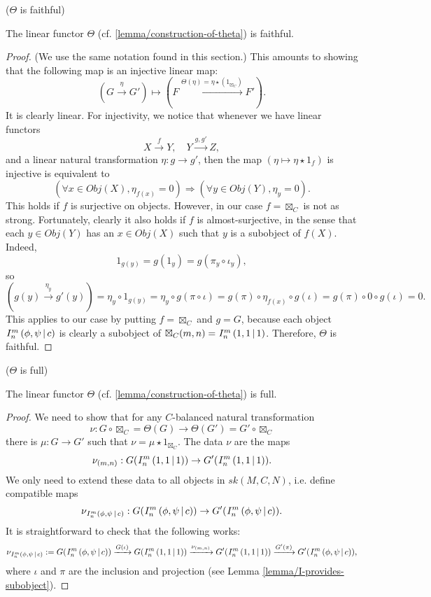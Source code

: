 \begin{lemma}\label{lemma/theta-is-faithful} ($\Theta$ is faithful)

  \noindent The linear functor $\Theta$ (cf. \ref{lemma/construction-of-theta}) is faithful.
\end{lemma}

\begin{proof}
  (We use the same notation found in this section.) This amounts to showing
  that the following map is an injective linear map:
  \[
    (G \xrightarrow{\eta} G') \mapsto (F \xrightarrow{\Theta(\eta) = \eta \star (1_{\boxtimes_{C}})} F').
  \]
  It is clearly linear. For injectivity, we notice that whenever we have
  linear functors
  \[
    X \xrightarrow{f} Y,\quad Y \xrightarrow{g, g'} Z,
  \]
  and a linear natural transformation $\eta: g \to g'$, then the map $(\eta \mapsto \eta \star 1_{f})$ is injective is equivalent to
  \[
    (\forall x \in Obj(X), \eta_{f(x)} = 0) \Rightarrow (\forall y \in Obj(Y), \eta_{y} = 0).
  \]
  This holds if $f$ is surjective on objects. However, in our case
  $f = \boxtimes_{C}$ is not as strong. Fortunately, clearly it also holds if
  $f$ is almost-surjective, in the sense that each $y \in Obj(Y)$ has an
  $x \in Obj(X)$ such that $y$ is a subobject of $f(X)$. Indeed,
  \[
    1_{g(y)} = g(1_{y}) = g(\pi_{y} \circ \iota_{y}),
  \]
  so
  \[
    (g(y) \xrightarrow{\eta_{y}} g'(y)) = \eta_{y} \circ 1_{g(y)} = \eta_{y} \circ g(\pi \circ \iota) = g(\pi) \circ \eta_{f(x)} \circ g(\iota) = g(\pi) \circ 0 \circ g(\iota) = 0.
  \]
  This applies to our case by putting $f = \boxtimes_{C}$ and $g = G$, because
  each object ${}^{}_{} I^{m}_{n} \left( \phi, \psi \,\middle|\, c \right)$ is clearly a subobject of
  $\boxtimes_{C}(m,n) = {}^{}_{} I^{m}_{n} \left( 1, 1 \,\middle|\, 1 \right)$. Therefore, $\Theta$ is faithful.
\end{proof}

\begin{lemma}\label{lemma/theta-is-full} ($\Theta$ is full)

  \noindent The linear functor $\Theta$ (cf. \ref{lemma/construction-of-theta}) is full.
\end{lemma}

\begin{proof}
  We need to show that for any $C$-balanced natural transformation
  \[
    \nu: G \circ \boxtimes_{C} = \Theta(G) \to \Theta(G') = G' \circ \boxtimes_{C}
  \]
  there is $\mu: G \to G'$ such that $\nu = \mu \star 1_{\boxtimes_{C}}$. The data $\nu$ are the maps
  \[
    \nu_{(m,n)}: G({}^{}_{} I^{m}_{n} \left( 1, 1 \,\middle|\, 1 \right)) \to G'({}^{}_{} I^{m}_{n} \left( 1, 1 \,\middle|\, 1 \right)).
  \]
  We only need to extend these data to all objects in $sk(M,C,N)$, i.e. define compatible maps
  \[
    \nu_{{}^{}_{} I^{m}_{n} \left( \phi, \psi \,\middle|\, c \right)}: G({}^{}_{} I^{m}_{n} \left( \phi, \psi \,\middle|\, c \right)) \to G'({}^{}_{} I^{m}_{n} \left( \phi, \psi \,\middle|\, c \right)).
  \]
  It is straightforward to check that the following works:
  \[
    \nu_{{}^{}_{} I^{m}_{n} \left( \phi, \psi \,\middle|\, c \right)}:= G({}^{}_{} I^{m}_{n} \left( \phi, \psi \,\middle|\, c \right))
    \xrightarrow{G(\iota)}
    G({}^{}_{} I^{m}_{n} \left( 1, 1 \,\middle|\, 1 \right))
    \xrightarrow{\nu_{(m,n)}}
    G'({}^{}_{} I^{m}_{n} \left( 1, 1 \,\middle|\, 1 \right))
    \xrightarrow{G'(\pi)}
    G'({}^{}_{} I^{m}_{n} \left( \phi, \psi \,\middle|\, c \right)),
  \]
  where $\iota$ and $\pi$ are the inclusion and projection (see
  Lemma \ref{lemma/I-provides-subobject}).
\end{proof}

